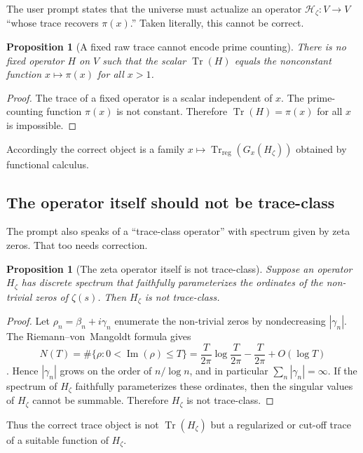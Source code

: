 \documentclass[11pt,a4paper]{article}
\theoremstyle{plain}
\newtheorem{proposition}[theorem]{Proposition}
\theoremstyle{definition}
\theoremstyle{remark}
\newcommand{\Tr}{\operatorname{Tr}}
\newcommand{\Trreg}{\operatorname{Tr}_{\mathrm{reg}}}
\newcommand{\Ima}{\operatorname{Im}}
\begin{document}
The user prompt states that the universe must actualize an operator $\mathcal H_\zeta : V \to V$ ``whose trace recovers $\pi(x)$.'' Taken literally, this cannot be correct.

\begin{proposition}[A fixed raw trace cannot encode prime counting]
\label{prop:rawtrace}
There is no fixed operator $H$ on $V$ such that the scalar $\Tr(H)$ equals the nonconstant function $x \mapsto \pi(x)$ for all $x>1$.
\end{proposition}

\begin{proof}
The trace of a fixed operator is a scalar independent of $x$. The prime-counting function $\pi(x)$ is not constant. Therefore $\Tr(H)=\pi(x)$ for all $x$ is impossible.
\end{proof}

Accordingly the correct object is a family $x \mapsto \Trreg(G_x(H_\zeta))$ obtained by functional calculus.

\subsection{The operator itself should not be trace-class}

The prompt also speaks of a ``trace-class operator'' with spectrum given by zeta zeros. That too needs correction.

\begin{proposition}[The zeta operator itself is not trace-class]
\label{prop:nottraceclass}
Suppose an operator $H_\zeta$ has discrete spectrum that faithfully parameterizes the ordinates of the non-trivial zeros of $\zeta(s)$. Then $H_\zeta$ is not trace-class.
\end{proposition}

\begin{proof}
Let $\rho_n = \beta_n + i\gamma_n$ enumerate the non-trivial zeros by nondecreasing $|\gamma_n|$. The Riemann--von~Mangoldt formula gives
\[
N(T)=\#\{\rho:0<\Ima(\rho)\le T\}=\frac{T}{2\pi}\log\frac{T}{2\pi}-\frac{T}{2\pi}+O(\log T)
\]
\citep{titchmarsh,edwards,bombieriRH}.
Hence $|\gamma_n|$ grows on the order of $n/\log n$, and in particular $\sum_n |\gamma_n|=\infty$. If the spectrum of $H_\zeta$ faithfully parameterizes these ordinates, then the singular values of $H_\zeta$ cannot be summable. Therefore $H_\zeta$ is not trace-class.
\end{proof}

Thus the correct trace object is not $\Tr(H_\zeta)$ but a regularized or cut-off trace of a suitable function of $H_\zeta$.
\end{document}

